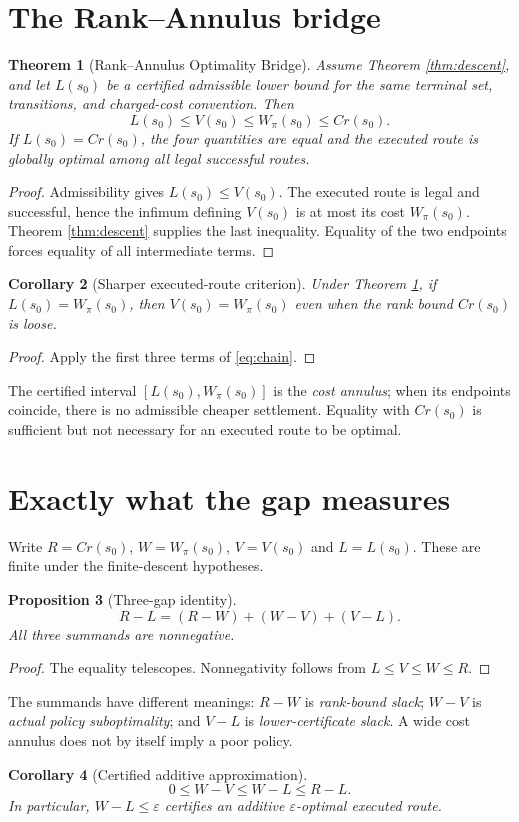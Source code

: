 \documentclass[11pt,letterpaper]{article}
\newtheorem{theorem}{Theorem}[section]
\newtheorem{proposition}[theorem]{Proposition}
\newtheorem{corollary}[theorem]{Corollary}
\theoremstyle{definition}\newtheorem{definition}[theorem]{Definition}\newtheorem{example}[theorem]{Example}
\theoremstyle{remark}\newtheorem{remark}[theorem]{Remark}
\begin{document}
\section{The Rank--Annulus bridge}
\begin{theorem}[Rank--Annulus Optimality Bridge]\label{thm:bridge}
Assume Theorem \ref{thm:descent}, and let $L(s_0)$ be a certified admissible lower bound for the same terminal set, transitions, and charged-cost convention. Then
\begin{equation}\label{eq:chain}
\boxed{L(s_0)\le V(s_0)\le W_\pi(s_0)\le Cr(s_0).}
\end{equation}
If $L(s_0)=Cr(s_0)$, the four quantities are equal and the executed route is globally optimal among all legal successful routes.
\end{theorem}
\begin{proof}
Admissibility gives $L(s_0)\le V(s_0)$. The executed route is legal and successful, hence the infimum defining $V(s_0)$ is at most its cost $W_\pi(s_0)$. Theorem \ref{thm:descent} supplies the last inequality. Equality of the two endpoints forces equality of all intermediate terms.
\end{proof}
\begin{corollary}[Sharper executed-route criterion]\label{cor:sharp}
Under Theorem \ref{thm:bridge}, if $L(s_0)=W_\pi(s_0)$, then $V(s_0)=W_\pi(s_0)$ even when the rank bound $Cr(s_0)$ is loose.
\end{corollary}
\begin{proof}
Apply the first three terms of \eqref{eq:chain}.
\end{proof}
The certified interval $[L(s_0),W_\pi(s_0)]$ is the \emph{cost annulus}; when its endpoints coincide, there is no admissible cheaper settlement. Equality with $Cr(s_0)$ is sufficient but not necessary for an executed route to be optimal.

\section{Exactly what the gap measures}
Write $R=Cr(s_0)$, $W=W_\pi(s_0)$, $V=V(s_0)$ and $L=L(s_0)$. These are finite under the finite-descent hypotheses.
\begin{proposition}[Three-gap identity]\label{prop:threegap}
\[
\boxed{R-L=(R-W)+(W-V)+(V-L).}
\]
All three summands are nonnegative.
\end{proposition}
\begin{proof}
The equality telescopes. Nonnegativity follows from $L\le V\le W\le R$.
\end{proof}
The summands have different meanings: $R-W$ is \emph{rank-bound slack}; $W-V$ is \emph{actual policy suboptimality}; and $V-L$ is \emph{lower-certificate slack}. A wide cost annulus does not by itself imply a poor policy.
\begin{corollary}[Certified additive approximation]
\[
0\le W-V\le W-L\le R-L.
\]
In particular, $W-L\le\varepsilon$ certifies an additive $\varepsilon$-optimal executed route.
\end{corollary}
\end{document}
